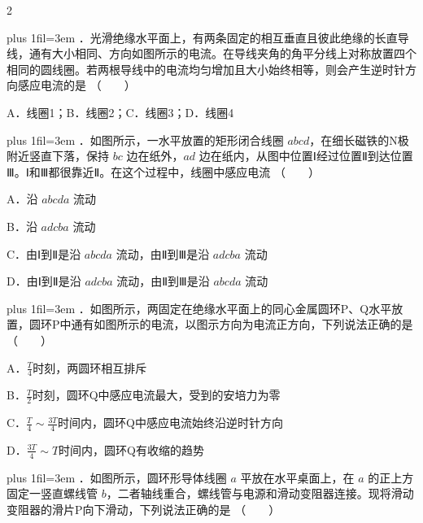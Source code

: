 \documentclass[fontset=none]{ctexart}
\newcommand{\xzitem}[2]{\par\glueguard{1}%
  {\rightskip=0pt plus 1fil\parfillskip=0pt\emergencystretch=3em\noindent
   {\fontsize{11.4pt}{14pt}\selectfont\heihao {\numboldjian #1}．}\hspace{4.1mm}#2%
   \penalty0\hbox{}\nobreak\hspace{0pt plus 1000fil}\nobreak\mbox{（　　）}\hspace{0.56mm}\par}%
  \addvspace{0pt}}
\begin{document}

\begin{multicols}{2}


\xzitem{1}{光滑绝缘水平面上，有两条固定的相互垂直且彼此绝缘的长直导线，通有大小相同、方向如图所示的电流。在导线夹角的角平分线上对称放置四个相同的圆线圈。若两根导线中的电流均匀增加且大小始终相等，则会产生逆时针方向感应电流的是}


\bindopt A．线圈1；B．线圈2；C．线圈3；D．线圈4\par

\xzitem{2}{如图所示，一水平放置的矩形闭合线圈 $abcd$，在细长磁铁的N极附近竖直下落，保持 $bc$ 边在纸外，$ad$ 边在纸内，从图中位置Ⅰ经过位置Ⅱ到达位置Ⅲ。Ⅰ和Ⅲ都很靠近Ⅱ。在这个过程中，线圈中感应电流}


\bindopt A．沿 $abcda$ 流动\par
\bindopt B．沿 $adcba$ 流动\par
\bindopt C．由Ⅰ到Ⅱ是沿 $abcda$ 流动，由Ⅱ到Ⅲ是沿 $adcba$ 流动\par
\bindopt D．由Ⅰ到Ⅱ是沿 $adcba$ 流动，由Ⅱ到Ⅲ是沿 $abcda$ 流动\par


\xzitem{3}{如图所示，两固定在绝缘水平面上的同心金属圆环P、Q水平放置，圆环P中通有如图所示的电流，以图示方向为电流正方向，下列说法正确的是}


\bindopt A．$\frac{T}{4}$时刻，两圆环相互排斥\par
\bindopt B．$\frac{T}{2}$时刻，圆环Q中感应电流最大，受到的安培力为零\par
\bindopt C．$\frac{T}{4}\sim\frac{3T}{4}$时间内，圆环Q中感应电流始终沿逆时针方向\par
\bindopt D．$\frac{3T}{4}\sim T$时间内，圆环Q有收缩的趋势\par


\xzitem{4}{如图所示，圆环形导体线圈 $a$ 平放在水平桌面上，在 $a$ 的正上方固定一竖直螺线管 $b$，二者轴线重合，螺线管与电源和滑动变阻器连接。现将滑动变阻器的滑片P向下滑动，下列说法正确的是}


\end{multicols}
\end{document}
